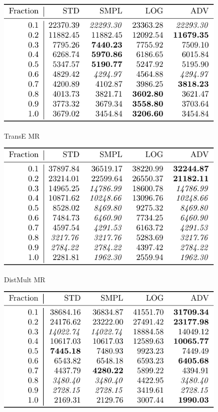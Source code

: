 \documentclass{article}
\begin{document}
\begin{figure}
\includegraphics[]{results_TransE_MR}\\
\caption{TransE MR}
\end{figure}\begin{figure}
\includegraphics[]{results_DistMult_MR}\\
\caption{DistMult MR}
\end{figure}\begin{figure}
\includegraphics[]{results_ComplEx_MR}\\

\end{figure}
\end{document}
